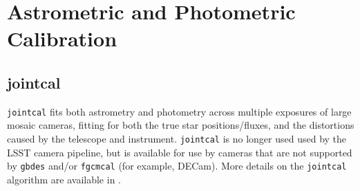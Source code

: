 \section{Astrometric and Photometric Calibration}




\subsection{jointcal}

\texttt{jointcal} fits both astrometry and photometry across multiple exposures of large mosaic cameras, fitting for both the true star positions/fluxes, and the distortions caused by the telescope and instrument.
\texttt{jointcal} is no longer used used by the LSST camera pipeline, but is available for use by cameras that are not supported by \texttt{gbdes} and/or \texttt{fgcmcal} (for example, DECam).
More details on the \texttt{jointcal} algorithm are available in \citep{DMTN-036}.
